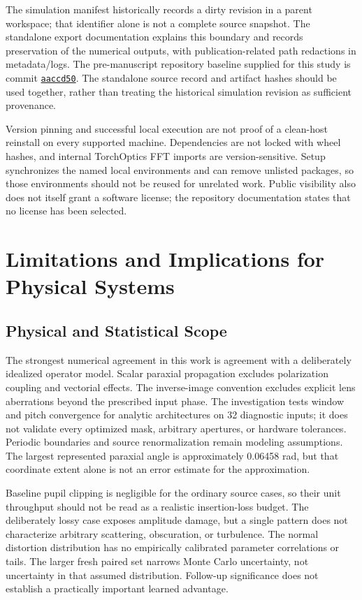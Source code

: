 \documentclass[journal]{IEEEtran}
\begin{document}
The simulation manifest historically records a dirty revision in a parent workspace; that identifier alone is not a complete source snapshot. The standalone export documentation explains this boundary and records preservation of the numerical outputs, with publication-related path redactions in metadata/logs. The pre-manuscript repository baseline supplied for this study is commit \href{https://github.com/MADjnr/fourier-quantum-communication/tree/aaccd508e712404303ca68f56911e6365cbcefe3}{\texttt{aaccd50}}. The standalone source record and artifact hashes should be used together, rather than treating the historical simulation revision as sufficient provenance.

Version pinning and successful local execution are not proof of a clean-host reinstall on every supported machine. Dependencies are not locked with wheel hashes, and internal TorchOptics FFT imports are version-sensitive. Setup synchronizes the named local environments and can remove unlisted packages, so those environments should not be reused for unrelated work. Public visibility also does not itself grant a software license; the repository documentation states that no license has been selected.

\section{Limitations and Implications for Physical Systems}
\subsection{Physical and Statistical Scope}
The strongest numerical agreement in this work is agreement with a deliberately idealized operator model. Scalar paraxial propagation excludes polarization coupling and vectorial effects. The inverse-image convention excludes explicit lens aberrations beyond the prescribed input phase. The investigation tests window and pitch convergence for analytic architectures on 32 diagnostic inputs; it does not validate every optimized mask, arbitrary apertures, or hardware tolerances. Periodic boundaries and source renormalization remain modeling assumptions. The largest represented paraxial angle is approximately 0.06458 rad, but that coordinate extent alone is not an error estimate for the approximation.

Baseline pupil clipping is negligible for the ordinary source cases, so their unit throughput should not be read as a realistic insertion-loss budget. The deliberately lossy case exposes amplitude damage, but a single pattern does not characterize arbitrary scattering, obscuration, or turbulence. The normal distortion distribution has no empirically calibrated parameter correlations or tails. The larger fresh paired set narrows Monte Carlo uncertainty, not uncertainty in that assumed distribution. Follow-up significance does not establish a practically important learned advantage.
\end{document}
